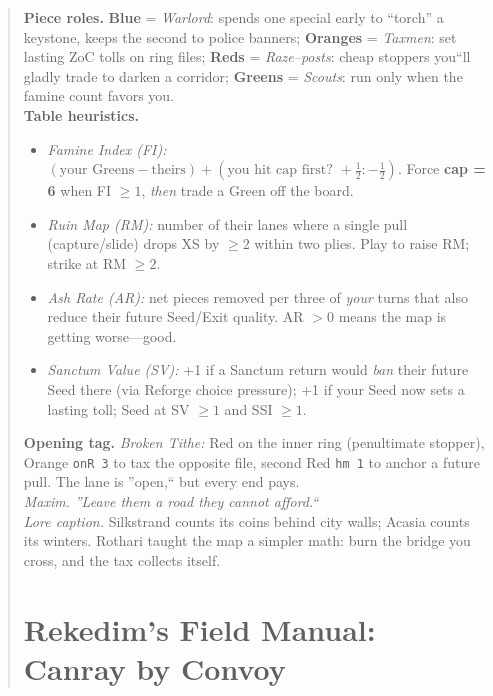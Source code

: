 \documentclass[11pt]{article}
\begin{document}
\begin{quote}
\noindent\textbf{Piece roles.} \textbf{Blue} = \emph{Warlord}: spends one special early to ``torch'' a keystone, keeps the second to police banners; \textbf{Oranges} = \emph{Taxmen}: set lasting ZoC tolls on ring files; \textbf{Reds} = \emph{Raze--posts}: cheap stoppers you``ll gladly trade to darken a corridor; \textbf{Greens} = \emph{Scouts}: run only when the famine count favors you.\\[0.25em]

\noindent\textbf{Table heuristics.}
\begin{itemize}\itemsep0.2em
  \item \emph{Famine Index (FI):} $(\text{your Greens} - \text{theirs}) + (\text{you hit cap first? }+\tfrac12:-\tfrac12)$. Force \textbf{cap = 6} when FI $\ge 1$, \emph{then} trade a Green off the board.
  \item \emph{Ruin Map (RM):} number of their lanes where a single pull (capture/slide) drops XS by $\ge 2$ within two plies. Play to raise RM; strike at RM $\ge 2$.
  \item \emph{Ash Rate (AR):} net pieces removed per three of \emph{your} turns that also reduce their future Seed/Exit quality. AR $> 0$ means the map is getting worse---good.
  \item \emph{Sanctum Value (SV):} +1 if a Sanctum return would \emph{ban} their future Seed there (via Reforge choice pressure); +1 if your Seed now sets a lasting toll; Seed at SV $\ge 1$ and SSI $\ge 1$.
\end{itemize}

\noindent\textbf{Opening tag.} \emph{Broken Tithe:} Red on the inner ring (penultimate stopper), Orange \texttt{onR 3} to tax the opposite file, second Red \texttt{hm 1} to anchor a future pull. The lane is ''open,`` but every end pays.\\

\noindent\emph{Maxim.} \textit{''Leave them a road they cannot afford.``}\\

\noindent\textit{Lore caption.} Silkstrand counts its coins behind city walls; Acasia counts its winters. Rothari taught the map a simpler math: burn the bridge you cross, and the tax collects itself.
\clearpage


\section{Rekedim's Field Manual: Canray by Convoy}
\label{sec:rekedim-manual}


\end{quote}
\end{document}
